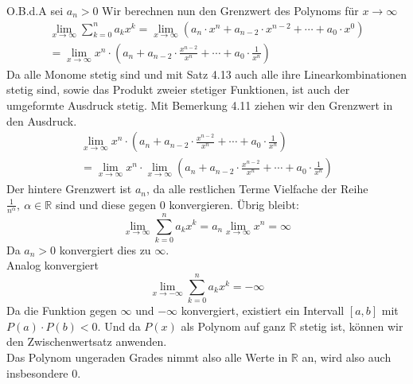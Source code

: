 \documentclass{article}
\begin{document}
    O.B.d.A sei \(a_n > 0\)
    Wir berechnen nun den Grenzwert des Polynoms für \(x \to \infty \)
    \begin{gather*}
        \lim_{x \to \infty} \sum_{k=0}^{n} a_k x^{k}
        = \lim_{x \to \infty} \left( a_n \cdot x^n + a_{n-2} \cdot x^{n-2} + \dotsm + a_0 \cdot x^0 \right) \\
        = \lim_{x \to \infty} x^n \cdot \left( a_n + a_{n-2} \cdot \frac{x^{n-2}}{x^n} + \dotsm + a_0 \cdot \frac{1}{x^n} \right)
    \end{gather*}
    Da alle Monome stetig sind und mit Satz 4.13 auch alle ihre Linearkombinationen stetig sind, sowie das Produkt
    zweier stetiger Funktionen, ist auch der umgeformte Ausdruck stetig. Mit Bemerkung 4.11 ziehen wir den Grenzwert in den Ausdruck.
    \begin{gather*}
        \lim_{x \to \infty} x^n \cdot \left( a_n + a_{n-2} \cdot \frac{x^{n-2}}{x^n} + \dotsm + a_0 \cdot \frac{1}{x^n} \right) \\
        = \lim_{x \to \infty} x^n \cdot \lim_{x \to \infty} \left( a_n + a_{n-2} \cdot \frac{x^{n-2}}{x^n} + \dotsm + a_0 \cdot \frac{1}{x^n} \right)
    \end{gather*}
    Der hintere Grenzwert ist \(a_n\),
    da alle restlichen Terme Vielfache der Reihe \(\frac{1}{n^{\alpha}}, \ \alpha \in \mathbb{R}\) sind und diese gegen 0 konvergieren.
    Übrig bleibt:
    \[ \lim_{x \to \infty} \sum_{k=0}^{n} a_k x^{k} = a_n \lim_{x \to \infty} x^n = \infty \]
    Da \(a_n > 0\) konvergiert dies zu \(\infty \). \\
    Analog konvergiert
    \[ \lim_{x \to -\infty} \sum_{k=0}^{n} a_k x^{k} = - \infty \]
    Da die Funktion gegen \(\infty \) und \(-\infty \) konvergiert,
    existiert ein Intervall \([a,b]\) mit \(P(a) \cdot P(b) < 0\). Und da \(P(x)\) als Polynom auf ganz \(\mathbb{R}\) stetig ist,
    können wir den Zwischenwertsatz anwenden. \\
    Das Polynom ungeraden Grades nimmt also alle Werte in \(\mathbb{R}\) an, wird also auch insbesondere 0.
\end{document}
